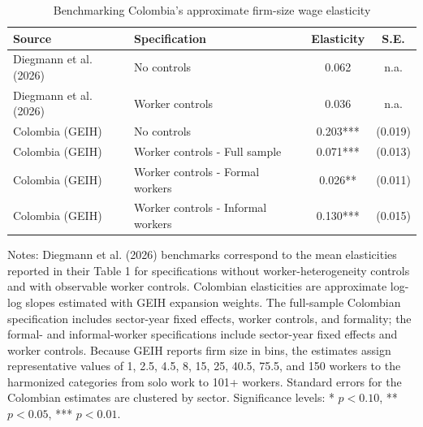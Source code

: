 \begin{table}[htbp]
  \centering
  \caption{Benchmarking Colombia's approximate firm-size wage elasticity}
  \label{tab:firm-size-elasticity-benchmark}
  \small
  \begin{tabular}{p{}p{}cc}
    \toprule
    Source & Specification & Elasticity & S.E. \\
    \midrule
    Diegmann et al. (2026) & No controls & 0.062 & n.a. \\
    Diegmann et al. (2026) & Worker controls & 0.036 & n.a. \\
    \midrule
    Colombia (GEIH) & No controls & 0.203*** & (0.019) \\
    Colombia (GEIH) & Worker controls - Full sample & 0.071*** & (0.013) \\
    Colombia (GEIH) & Worker controls - Formal workers & 0.026** & (0.011) \\
    Colombia (GEIH) & Worker controls - Informal workers & 0.130*** & (0.015) \\
    \bottomrule
  \end{tabular}
  \vspace{0.3em}
  \begin{minipage}{0.95\textwidth}
  \footnotesize
  Notes: Diegmann et al. (2026) benchmarks correspond to the mean elasticities reported in their Table 1 for specifications without worker-heterogeneity controls and with observable worker controls. Colombian elasticities are approximate log-log slopes estimated with GEIH expansion weights. The full-sample Colombian specification includes sector-year fixed effects, worker controls, and formality; the formal- and informal-worker specifications include sector-year fixed effects and worker controls. Because GEIH reports firm size in bins, the estimates assign representative values of 1, 2.5, 4.5, 8, 15, 25, 40.5, 75.5, and 150 workers to the harmonized categories from solo work to 101+ workers. Standard errors for the Colombian estimates are clustered by sector. Significance levels: * $p<0.10$, ** $p<0.05$, *** $p<0.01$.
  \end{minipage}
\end{table}
